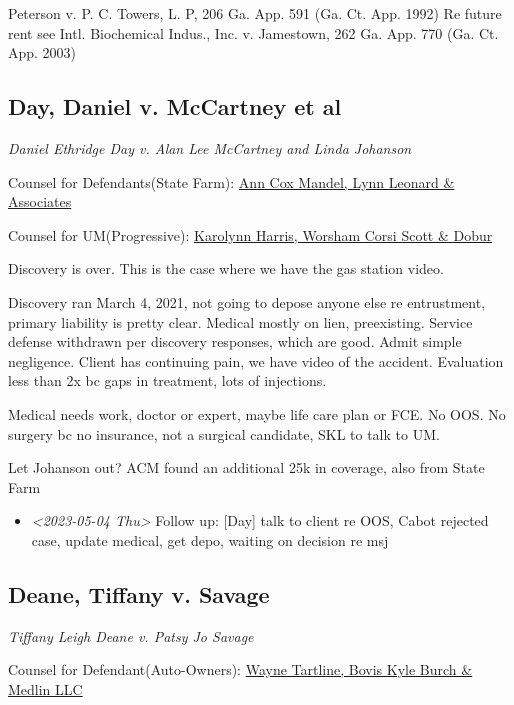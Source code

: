 \documentclass[11pt]{article}
\begin{document}
Peterson v. P. C. Towers, L. P, 206 Ga. App. 591 (Ga. Ct. App. 1992)
Re future rent see Intl. Biochemical Indus., Inc. v. Jamestown, 262 Ga. App. 770 (Ga. Ct. App. 2003)

\subsection*{Day, Daniel v. McCartney et al}
\label{sec:org89f5b5a}

\emph{Daniel Ethridge Day v. Alan Lee McCartney and Linda Johanson} 

Counsel for Defendants(State Farm): \href{https://gabar.reliaguide.com/lawyer/30345-GA-Ann-Mandel-254226}{Ann Cox Mandel, Lynn Leonard \& Associates}

Counsel for UM(Progressive): \href{https://gabar.reliaguide.com/lawyer/30006-GA-Karolynn-Harris-252472}{Karolynn Harris, Worsham Corsi Scott \& Dobur}

Discovery is over. This is the case where we have the gas station video.

Discovery ran March 4, 2021, not going to depose anyone else re entrustment, primary liability is pretty clear. Medical mostly on lien, preexisting. Service defense withdrawn per discovery responses, which are good. Admit simple negligence. Client has continuing pain, we have video of the accident. Evaluation less than 2x bc gaps in treatment, lots of injections.

Medical needs work, doctor or expert, maybe life care plan or FCE. No OOS. No surgery bc no insurance, not a surgical candidate, SKL to talk to UM.

Let Johanson out? ACM found an additional 25k in coverage, also from State Farm

\begin{itemize}
\item \textit{<2023-05-04 Thu> } Follow up: [Day] talk to client re OOS, Cabot rejected case, update medical, get depo, waiting on decision re msj
\end{itemize}

\subsection*{Deane, Tiffany v. Savage}
\label{sec:orgbe6d29b}

\emph{Tiffany Leigh Deane v. Patsy Jo Savage} 

Counsel for Defendant(Auto-Owners): \href{https://gabar.reliaguide.com/lawyer/30338-GA-Wayne-Tartline-248299}{Wayne Tartline, Bovis Kyle Burch \& Medlin LLC}
\end{document}
